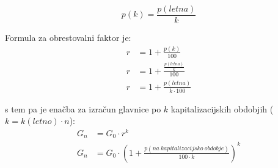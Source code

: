 \documentclass[12pt]{article}
\begin{document}
        \begin{equation}
            p(k) = \frac{p(letna)}{k}
            \label{rom}
        \end{equation}

        Formula za obrestovalni faktor je:
        \begin{equation}
            \begin{split}
                r & = 1 + \frac{p(k)}{100} \\
                r & = 1 + \frac{\frac{p(letna)}{k}}{100} \\
                r & = 1 + \frac{p(letna)}{k \cdot 100}
            \end{split}
        \end{equation}

        s tem pa je enačba za izračun glavnice po $k$ kapitalizacijskih obdobjih 
        ($k = k(letno) \cdot n$):
        \begin{equation}
            \begin{split}
                G_n & = G_0 \cdot r^k \\
                G_n & = G_0 \cdot (1 + \frac{p(na \: kapitalizacijsko \: obdobje)}{100 \cdot k})^k
            \end{split}
        \end{equation}
\end{document}
